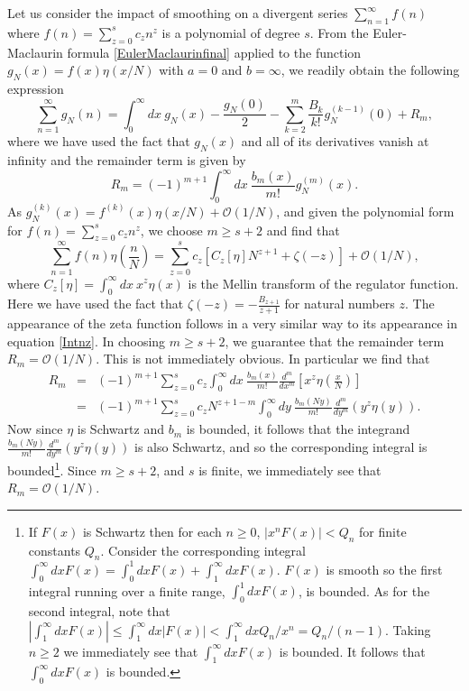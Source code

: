\documentclass[12pt, letter]{article}
\def\be{\begin{equation}}
\def\ee{\end{equation}}
\begin{document}
Let us consider the impact of smoothing on a divergent series $\sum_{n=1}^\infty f(n)$ where $f(n)=\sum_{z=0}^s c_z n^z$ is a polynomial of degree  $s$. From the Euler-Maclaurin formula \eqref{EulerMaclaurinfinal} applied to the function $g_N(x)=f(x)\eta(x/N)$ with $a=0$ and $b=\infty$, we readily obtain the following expression
\begin{equation}\label{EM}
\sum_{n=1}^\infty g_N(n)= \int^\infty_0 dx \ g_N(x) - \frac{g_N(0)}{2}- \sum \limits_{k=2}^{m}  \frac{B_{k}}{k!} g_N^{(k-1)} (0)+ R_m,
\end{equation}
where we have used the fact that $g_N(x)$ and all of its derivatives vanish at infinity and the remainder term is given by 
\be
R_m= (-1)^{m+1} \int^\infty_0 dx \ \frac{b_{m}(x)}{m!} g_N^{(m)}(x).
\ee
As $g_N^{(k)}(x)=f^{(k)}(x)\eta(x/N)+\mathcal{O}(1/N)$, and given the polynomial form for $f(n)=\sum_{z=0}^s c_z n^z$, we choose $m \geq s+2$ and find that
\begin{equation}\label{EM2}
\sum_{n=1}^\infty f(n)\eta\left(\frac{n}{N}\right)= \sum_{z=0}^s c_z \left[C_{z}[\eta]   N^{z+1} +\zeta(-z)\right]+\mathcal{O}(1/N),
\end{equation}
where  $C_{z}[\eta] =\int_0^\infty dx  \ x^z \eta(x)$ is the Mellin transform of the regulator function. Here we have used the fact that $\zeta(-z)=-\frac{B_{z+1}}{z+1}$ for natural numbers $z$. The appearance of the zeta function follows in a very similar way to its appearance in equation \eqref{Intnz}. In choosing $m \geq s+2$, we guarantee that the remainder term $R_m =\mathcal{O}(1/N)$.  This is not immediately obvious. In particular we find that 
\begin{eqnarray}
R_{m} &=& (-1)^{m+1}  \sum_{z=0}^s c_z  \int^\infty_0 dx \ \frac{b_{m}(x)}{m!} \frac{d^m}{d x^m} \left[  x^z   \eta\left(\frac{x}{N}\right)\right] \\
&=& (-1)^{m+1}  \sum_{z=0}^s c_z  N^{z+1-m} \int^\infty_0 dy \ \frac{b_{m}(Ny)}{m!} \frac{d^m}{d y^m} (  y^z   \eta\left(y\right)).
\end{eqnarray}
Now since $\eta$ is Schwartz and $b_m$ is  bounded, it follows that the integrand $\frac{b_{m}(Ny)}{m!} \frac{d^m}{d y^m} (  y^z   \eta\left(y\right))$ is also Schwartz, and so the corresponding integral is bounded\footnote{If $F(x)$ is Schwartz then for each $n\geq 0$,  $|x^n F(x)|<Q_{n}$ for finite constants $Q_n$. Consider the corresponding integral $\int_0^\infty dx F(x)= \int_0^1dx F(x) +\int_1^\infty dx F(x)$. $F(x)$ is smooth so the first integral running over a finite range, $ \int_0^1dx F(x) $,  is bounded. As for the second integral, note that $\left| \int_1^\infty dx F(x)\right| \leq \int_1^\infty dx |F(x)| < \int_1^\infty dx Q_n/x^n=Q_n/(n-1)$.  Taking $n \geq 2$ we immediately see that  $\int_1^\infty dx F(x)$ is bounded. It follows that  $\int_0^\infty dx F(x)$ is bounded.}. Since $m \geq s+2$, and $s$ is finite,  we immediately see that $R_m =\mathcal{O}(1/N)$.
\end{document}
